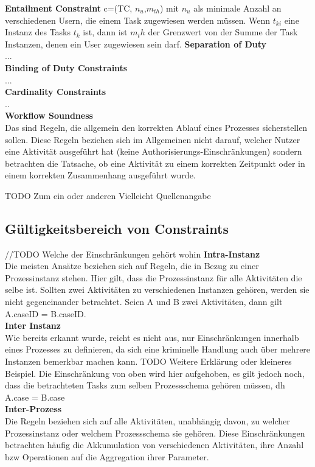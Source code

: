 \textbf{Entailment Constraint}
c=(TC, $n_u$,$m_{th}$) mit $n_u$ als minimale Anzahl an verschiedenen Usern, die einem Task zugewiesen werden müssen. Wenn $t_{ki}$ eine Instanz des Tasks $t_k$ ist, dann ist $m_th$ der Grenzwert von der Summe der Task Instanzen, denen ein User zugewiesen sein darf.
\cite{wolter_modeling_of_TBAC_in_BPMN}
\textbf{Separation of Duty}\\
...\\
\textbf{Binding of Duty Constraints}\\
...\\
\textbf{Cardinality Constraints}\\
..\\
\textbf{Workflow Soundness}\\
Das sind Regeln, die allgemein den korrekten Ablauf eines Prozesses sicherstellen sollen. Diese Regeln beziehen sich im Allgemeinen nicht darauf, welcher Nutzer eine Aktivität ausgeführt hat (keine Authorisierungs-Einschränkungen) sondern betrachten die Tatsache, ob eine Aktivität zu einem korrekten Zeitpunkt oder in einem korrekten Zusammenhang ausgeführt wurde.

TODO Zum ein oder anderen Vielleicht Quellenangabe

\subsection{Gültigkeitsbereich von Constraints}
//TODO Welche der Einschränkungen gehört wohin
\textbf{Intra-Instanz}\\
Die meisten Ansätze beziehen sich auf Regeln, die in Bezug zu einer Prozessinstanz stehen. Hier gilt, dass die Prozessinstanz für alle Aktivitäten die selbe ist. Sollten zwei Aktivitäten zu verschiedenen Instanzen gehören, werden sie nicht gegeneinander betrachtet. Seien A und B zwei Aktivitäten, dann gilt A.caseID = B.caseID. 
\\
\textbf{Inter Instanz}\\
Wie bereits erkannt wurde, reicht es nicht aus, nur Einschränkungen innerhalb eines Prozesses zu definieren, da sich eine kriminelle Handlung auch über mehrere Instanzen bemerkbar machen kann. TODO Weitere Erklärung oder kleineres Beispiel. Die Einschränkung von oben wird hier aufgehoben, es gilt jedoch noch, dass die betrachteten Tasks zum selben Prozessschema gehören müssen, dh A.case = B.case
\\
\textbf{Inter-Prozess}\\
Die Regeln beziehen sich auf alle Aktivitäten, unabhängig davon, zu welcher Prozessinstanz oder welchem Prozessschema sie gehören. Diese Einschränkungen betrachten häufig die Akkumulation von verschiedenen Aktivitäten, ihre Anzahl bzw Operationen auf die Aggregation ihrer Parameter.

